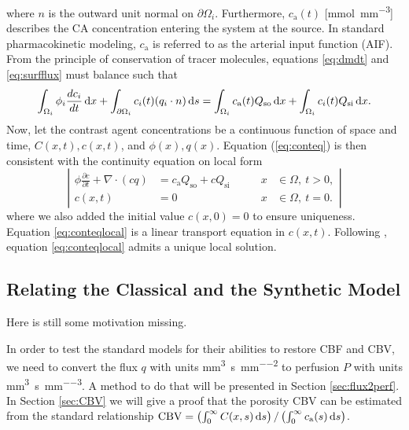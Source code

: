 \documentclass[paper=a4, fontsize=11pt,parskip=half,headings=small]{scrartcl}
\newcommand{\Qso}{Q_{\mathrm{so}}}
\newcommand{\Qsi}{Q_{\mathrm{si}}}
\newcommand{\ca}{c_\mathrm{a}}
\newcommand{\CBV}{\mathrm{CBV}}
\newcommand{\siQmm}{\milli\meter\cubed\per\second\per\milli\meter\cubed}
\newcommand{\siq}{\milli\meter\cubed\per\second\per\milli\meter\squared}
\newcommand{\sic}{\milli\mol\per\milli\meter\cubed}
\begin{document}
	where $n$ is the outward unit normal on $\partial \Omega_i$.
	Furthermore, $\ca(t)$ [\si{\sic}] describes the CA concentration entering the system at the source. 
	In standard pharmacokinetic modeling, $\ca$ is referred to as the arterial input function (AIF).
	From the principle of conservation of tracer molecules, equations \eqref{eq:dmdt} and \eqref{eq:surfflux} must balance such that
	\begin{equation}
		\int_{\Omega_i} \phi_i \frac{d c_i}{dt} \diffint x + \int_{ \partial \Omega_i}c_i(t)(q_i \cdot n) \diffint s = \int_{\Omega_i}\ca(t)\Qso \diffint x + \int_{\Omega_i}c_i(t) \Qsi \diffint x.
		\label{eq:conteq}
	\end{equation}
	Now, let the contrast agent concentrations be a continuous function of space and time, $C(x,t),c(x,t)$, and $\phi(x),q(x)$. Equation (\ref{eq:conteq}) is then consistent with the continuity equation on local form
	\begin{equation}
		\left\vert
		\begin{alignedat}{2}
			\phi \frac{\partial c}{\partial t} + \nabla \cdot (cq) &= \ca\Qso + c\Qsi \qquad	&x &\in \Omega, \ t>0,  \\
			c(x,t) &= 0 																			 	&x &\in \Omega, \ t=0.
		\end{alignedat}
		\right\vert
		\label{eq:conteqlocal}
	\end{equation}
	where we also added the initial value $c(x,0) = 0$ to ensure uniqueness.
	Equation \eqref{eq:conteqlocal} is a linear transport equation in $c(x,t)$. 
	Following \cite{evans98}, equation \eqref{eq:conteqlocal} admits a unique local solution.


	\subsection{Relating the Classical and the Synthetic Model}\label{sec:relation}
	Here is still some motivation missing.
	
	In order to test the standard models for their abilities to restore CBF and CBV, we need to convert the flux $q$ with units \si{\siq} to perfusion $P$ with units \si{\siQmm}. 
	A method to do that will be presented in Section \ref{sec:flux2perf}.
	In Section \ref{sec:CBV} we will give a proof that the porosity CBV can be estimated from the standard relationship $\CBV = \left(\int_0^\infty C(x,s) \diffint s\right)/\left(\int_0^\infty \ca(s) \diffint s\right)$.
	
\end{document}
